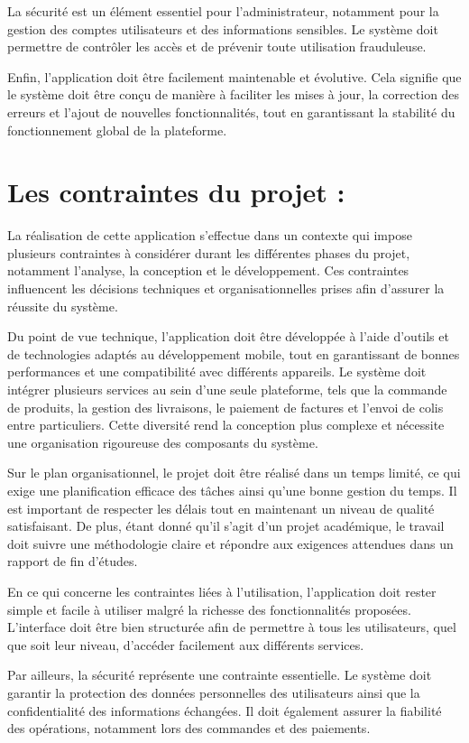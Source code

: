 \documentclass[12pt,fleqn,a4paper]{report}
\begin{document}
\begin{justify}
La sécurité est un élément essentiel pour l'administrateur, notamment pour la gestion des comptes utilisateurs et des informations sensibles. Le système doit permettre de contrôler les accès et de prévenir toute utilisation frauduleuse.

Enfin, l'application doit être facilement maintenable et évolutive. Cela signifie que le système doit être conçu de manière à faciliter les mises à jour, la correction des erreurs et l'ajout de nouvelles fonctionnalités, tout en garantissant la stabilité du fonctionnement global de la plateforme.
\section{Les contraintes du projet :}
La réalisation de cette application s'effectue dans un contexte qui impose plusieurs contraintes à considérer durant les différentes phases du projet, notamment l'analyse, la conception et le développement. Ces contraintes influencent les décisions techniques et organisationnelles prises afin d'assurer la réussite du système.

Du point de vue technique, l'application doit être développée à l'aide d'outils et de technologies adaptés au développement mobile, tout en garantissant de bonnes performances et une compatibilité avec différents appareils. Le système doit intégrer plusieurs services au sein d'une seule plateforme, tels que la commande de produits, la gestion des livraisons, le paiement de factures et l'envoi de colis entre particuliers. Cette diversité rend la conception plus complexe et nécessite une organisation rigoureuse des composants du système.

Sur le plan organisationnel, le projet doit être réalisé dans un temps limité, ce qui exige une planification efficace des tâches ainsi qu'une bonne gestion du temps. Il est important de respecter les délais tout en maintenant un niveau de qualité satisfaisant. De plus, étant donné qu'il s'agit d'un projet académique, le travail doit suivre une méthodologie claire et répondre aux exigences attendues dans un rapport de fin d'études.

En ce qui concerne les contraintes liées à l'utilisation, l'application doit rester simple et facile à utiliser malgré la richesse des fonctionnalités proposées. L'interface doit être bien structurée afin de permettre à tous les utilisateurs, quel que soit leur niveau, d'accéder facilement aux différents services.

Par ailleurs, la sécurité représente une contrainte essentielle. Le système doit garantir la protection des données personnelles des utilisateurs ainsi que la confidentialité des informations échangées. Il doit également assurer la fiabilité des opérations, notamment lors des commandes et des paiements.


\end{justify}
\end{document}
